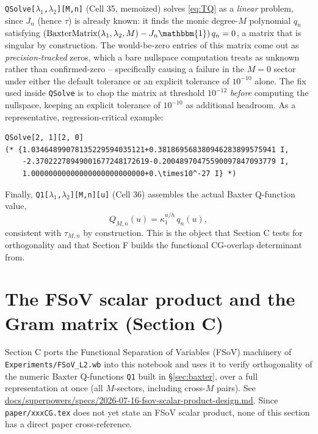 \documentclass[11pt]{article}
\begin{document}
\texttt{QSolve[$\lambda_1$,$\lambda_2$][M,n]} (Cell 35, memoized) solves \eqref{eq:TQ} as a
\emph{linear} problem, since $J_n$ (hence $\tau$) is already known: it finds the monic degree-$M$
polynomial $q_n$ satisfying $(\mathrm{BaxterMatrix}(\lambda_1,\lambda_2,M) - J_n\mathbbm{1})\, q_n = 0$,
a matrix that is singular by construction. The would-be-zero entries of this matrix come out as
\emph{precision-tracked} zeros, which a bare nullspace computation treats as unknown rather than
confirmed-zero -- specifically causing a failure in the $M=0$ sector under either the default
tolerance or an explicit tolerance of $10^{-10}$ alone. The fix used inside \texttt{QSolve} is to
chop the matrix at threshold $10^{-12}$ \emph{before} computing the nullspace, keeping an explicit
tolerance of $10^{-10}$ as additional headroom. As a representative, regression-critical example:
\begin{verbatim}
QSolve[2, 1][2, 0]
(* {1.03464899078135229594035121+0.381869568380946283899575941 I,
    -2.37022278949001677248172619-0.20048970475590097847093779 I,
    1.00000000000000000000000000+0.\times10^-27 I} *)
\end{verbatim}
Finally, \texttt{Q1[$\lambda_1$,$\lambda_2$][M,n][u]} (Cell 36) assembles the actual Baxter
Q-function value,
\[
  Q_{M,n}(u) = \kappa_1^{u/h}\, q_n(u),
\]
consistent with $\tau_{M,n}$ by construction. This is the object that Section C tests for
orthogonality and that Section F builds the functional CG-overlap determinant from.

\section{The FSoV scalar product and the Gram matrix (Section C)}
\label{sec:fsov}

Section C ports the Functional Separation of Variables (FSoV) machinery of
\texttt{Experiments/FSoV\_L2.wb} into this notebook and uses it to verify orthogonality of the
numeric Baxter Q-functions \texttt{Q1} built in \S\ref{sec:baxter}, over a full representation at
once (all $M$-sectors, including cross-$M$ pairs). See
\url{docs/superpowers/specs/2026-07-16-fsov-scalar-product-design.md}. Since
\texttt{paper/xxxCG.tex} does not yet state an FSoV scalar product, none of this section has a
direct paper cross-reference.
\end{document}
